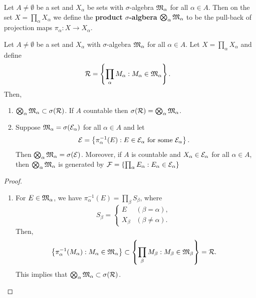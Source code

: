 \documentclass[a4paper]{article}
\begin{document}
\begin{defi}
  Let $A \neq \emptyset$ be a set and $X_\alpha$ be sets with
  $\sigma$-algebra $\mathfrak{M}_\alpha$ for all $\alpha \in A$. Then on the set $X
    = \prod_\alpha X_\alpha$ we define the \textbf{product $\sigma$-algbera}
  $\bigotimes_\alpha \mathfrak{M}_\alpha$ to be the pull-back of projection maps
  $\pi_\alpha : X \to X_\alpha$.
\end{defi}
{
  \begin{thm}
    Let $A \neq \emptyset$ be a set and $X_\alpha$ with $\sigma$-algebra
    $\mathfrak{M}_\alpha$ for all $\alpha \in A$. Let $X = \prod_\alpha X_\alpha$
    and define
    \[
      \mathcal{R} = \left\{ \prod_\alpha M_\alpha:
      M_\alpha \in \mathfrak{M}_\alpha \right\}.
    \]
    Then,
    \begin{enumerate}
      \item $\bigotimes_\alpha \mathfrak{M}_\alpha \subset \sigma
              (\mathcal{R})$. If $A$ countable then $\sigma(\mathcal{R})
              = \bigotimes_\alpha \mathfrak{M}_\alpha$.

      \item Suppose $\mathfrak{M}_\alpha = \sigma(\mathcal{E}_\alpha)$ for all $\alpha
            \in A$ and let
            \[
              \mathcal{E} = \left\{ \pi_\alpha^{-1}(E) :
              E \in \mathcal{E}_\alpha \text{ for some $\mathcal{E}_\alpha$} \right\}.
            \]
            Then $\bigotimes_\alpha \mathfrak{M}_\alpha = \sigma(\mathcal{E})$. Moreover,
            if $A$ is countable and $X_\alpha \in \mathcal{E}_\alpha$ for all
            $\alpha \in A$, then $\bigotimes_\alpha \mathfrak{M}_\alpha$ is
            generated by $\mathcal{F} = \left\{ \prod_\alpha E_\alpha : E_\alpha
            \in \mathcal{E}_\alpha \right\}$
    \end{enumerate}
  \end{thm}

  \begin{proof}
    \begin{enumerate}
      \item For $E \in \mathfrak{M}_\alpha$, we have $\pi^{-1}_\alpha (E) =
            \prod_\beta S_\beta$, where
            \[
              S_\beta = \begin{cases}
                E       & (\beta = \alpha),    \\
                X_\beta & (\beta \neq \alpha).
              \end{cases}
            \]
            Then,
            \[
              \left\{ \pi_\alpha^{-1}(M_\alpha) : M_\alpha
              \in \mathfrak{M}_\alpha \right\}
              \subset \left\{ \prod_\beta M_\beta: M_\beta \in
              \mathfrak{M}_\beta \right\} = \mathcal{R}.
            \]
            This implies that $\bigotimes_\alpha \mathfrak{M}_\alpha \subset
            \sigma(\mathcal{R})$.


\end{enumerate}
\end{proof}}
\end{document}
